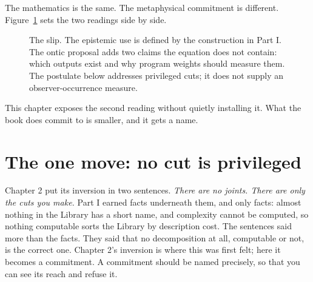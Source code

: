 The mathematics is the same. The metaphysical commitment is different. Figure~\ref{fig:slip} sets the two readings side by side.

\begin{figure}[h]
\centering
{}
\caption{The slip. The epistemic use is defined by the construction in Part I. The ontic proposal adds two claims the equation does not contain: which outputs exist and why program weights should measure them. The postulate below addresses privileged cuts; it does not supply an observer-occurrence measure.}
\label{fig:slip}
\end{figure}

This chapter exposes the second reading without quietly installing it. What the book does commit to is smaller, and it gets a name.

\section*{The one move: no cut is privileged}

Chapter 2 put its inversion in two sentences. \emph{There are no joints. There are only the cuts you make.} Part I earned facts underneath them, and only facts: almost nothing in the Library has a short name, and complexity cannot be computed, so nothing computable sorts the Library by description cost. The sentences said more than the facts. They said that no decomposition at all, computable or not, is the correct one. Chapter 2's inversion is where this was first felt; here it becomes a commitment. A commitment should be named precisely, so that you can see its reach and refuse it.

